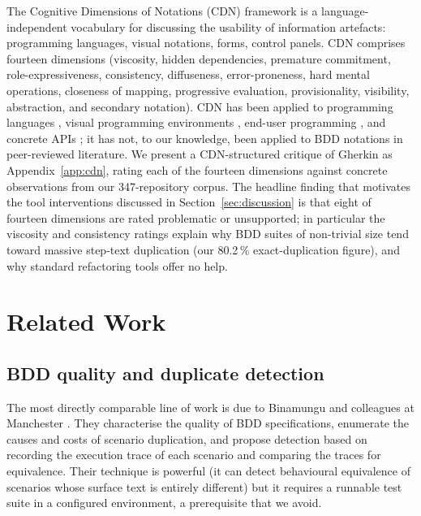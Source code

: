 \documentclass[11pt,a4paper]{article}
\begin{document}
The Cognitive Dimensions of Notations (CDN) framework
\citep{green1989cdn,green1996petre,blackwell2003cdn} is a
language-independent vocabulary for discussing the usability of
information artefacts: programming languages, visual notations,
forms, control panels. CDN comprises fourteen dimensions
(viscosity, hidden dependencies, premature commitment,
role-expressiveness, consistency, diffuseness, error-proneness,
hard mental operations, closeness of mapping, progressive
evaluation, provisionality, visibility, abstraction, and secondary
notation). CDN has been applied to programming languages
\citep{kutar2002cdn,clarke2004cdn}, visual programming environments
\citep{green1992visualbasic}, end-user programming
\citep{blackwell2004firstmover}, and concrete APIs
\citep{stylos2007usability,piccioni2013apis}; it has not, to our
knowledge, been applied to BDD notations in peer-reviewed
literature. We present a CDN-structured critique of Gherkin as
Appendix~\ref{app:cdn}, rating each of the fourteen dimensions
against concrete observations from our 347-repository corpus. The
headline finding that motivates the tool interventions discussed
in Section~\ref{sec:discussion} is that eight of fourteen
dimensions are rated problematic or unsupported; in particular the
viscosity and consistency ratings explain why BDD suites of
non-trivial size tend toward massive step-text duplication (our
80.2\,\% exact-duplication figure), and why standard refactoring
tools offer no help.

\section{Related Work}
\label{sec:related}

\subsection{BDD quality and duplicate detection}

The most directly comparable line of work is due to Binamungu and
colleagues at Manchester
\citep{binamungu2018vst,binamungu2018saner,binamungu2020xp,binamungu2020phd,binamungu2023jss}.
They characterise the quality of BDD specifications, enumerate the
causes and costs of scenario duplication, and propose detection based
on recording the execution trace of each scenario and comparing the
traces for equivalence. Their technique is powerful (it can detect
behavioural equivalence of scenarios whose surface text is entirely
different) but it requires a runnable test suite in a configured
environment, a prerequisite that we avoid.
\end{document}
